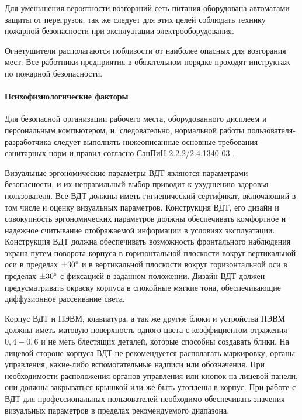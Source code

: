 Для уменьшения вероятности возгораний сеть питания оборудована автоматами защиты от перегрузок,
так же следует для этих целей соблюдать технику пожарной безопасности при эксплуатации
электрооборудования.

Огнетушители располагаются поблизости от наиболее опасных для возгорания мест.
Все работники предприятия в обязательном порядке проходят инструктаж по пожарной
безопасности.

\paragraph{Психофизиологические факторы}

Для безопасной организации рабочего места, оборудованного дисплеем и персональным
компьютером, и, следовательно, нормальной работы пользователя-разработчика следует
выполнять нижеописанные основные требования санитарных норм и правил согласно
СанПиН 2.2.2/2.4.1340-03 \cite{ecology_sanpin_1340_03}.

Визуальные эргономические параметры ВДТ являются параметрами безопасности,
и их неправильный выбор приводит к ухудшению здоровья пользователя. Все ВДТ
должны иметь гигиенический сертификат, включающий в том числе и оценку визуальных
параметров. Конструкция ВДТ, его дизайн и совокупность эргономических параметров
должны обеспечивать комфортное и надежное считывание отображаемой информации в
условиях эксплуатации. Конструкция ВДТ должна обеспечивать возможность фронтального
наблюдения экрана путем поворота корпуса в горизонтальной плоскости вокруг
вертикальной оси в пределах $\pm 30 \degree$ и в вертикальной плоскости вокруг
горизонтальной оси в пределах $\pm 30 \degree$ с фиксацией в заданном положении.
Дизайн ВДТ должен предусматривать окраску корпуса в спокойные мягкие тона,
обеспечивающие диффузионное рассеивание света.

Корпус ВДТ и ПЭВМ, клавиатура, а так же другие блоки и устройства ПЭВМ должны
иметь матовую поверхность одного цвета с коэффициентом отражения $0,4 - 0,6$ и
не меть блестящих деталей, которые способны создавать блики. На лицевой стороне
корпуса ВДТ не рекомендуется располагать маркировку, органы управления, какие-либо
вспомогательные надписи или обозначения. При необходимости расположения органов
управления или кнопок на лицевой панели, они должны закрываться крышкой или же
быть утоплены в корпус. При работе с ВДТ для профессиональных пользователей необходимо
обеспечивать значения визуальных параметров в пределах рекомендуемого диапазона.

